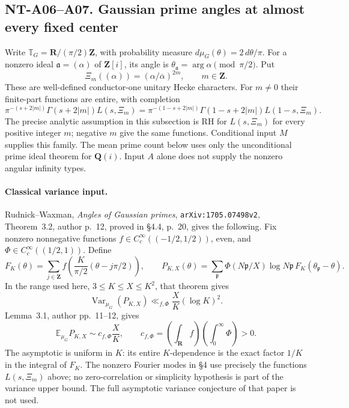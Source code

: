 \subsection*{NT-A06--A07. Gaussian prime angles at almost every fixed center}

Write \(\mathbb T_G=\mathbf R/(\pi/2)\mathbf Z\), with probability
measure \(d\mu_G(\theta)=2\,d\theta/\pi\). For a nonzero ideal
\(\mathfrak a=(\alpha)\) of \(\mathbf Z[i]\), its angle is
\(\theta_{\mathfrak a}=\arg\alpha\pmod{\pi/2}\). Put
\[
 \Xi_m((\alpha))=(\alpha/\overline\alpha)^{2m},
 \qquad m\in\mathbf Z .
\]
These are well-defined conductor-one unitary Hecke characters.
For \(m\ne0\) their finite-part functions are entire, with completion
\[
 \pi^{-(s+2|m|)}\Gamma(s+2|m|)L(s,\Xi_m)
 =
 \pi^{-(1-s+2|m|)}\Gamma(1-s+2|m|)L(1-s,\Xi_m).
\]
The precise analytic assumption in this subsection is RH for
\(L(s,\Xi_m)\) for every positive integer \(m\); negative \(m\)
give the same functions. Conditional input \(M\) supplies this family.
The mean prime count below uses only the unconditional prime ideal
theorem for \(\mathbf Q(i)\). Input \(A\) alone does not supply the
nonzero angular infinity types.

\paragraph{Classical variance input.}
Rudnick--Waxman, \emph{Angles of Gaussian primes},
\texttt{arXiv:1705.07498v2}, Theorem~3.2, author p.~12,
proved in \S4.4, p.~20, gives the following. Fix nonzero nonnegative
functions \(f\in C_c^\infty((-1/2,1/2))\), even, and
\(\Phi\in C_c^\infty((1/2,1))\). Define
\[
 F_K(\theta)=\sum_{j\in\mathbf Z}
 f\left(\frac{K}{\pi/2}(\theta-j\pi/2)\right),\qquad
 P_{K,X}(\theta)=
 \sum_{\mathfrak p}\Phi(N\mathfrak p/X)\log N\mathfrak p\,
                         F_K(\theta_{\mathfrak p}-\theta).
\]
In the range used here, \(3\le K\le X\le K^2\), that theorem gives
\[
 \operatorname{Var}_{\mu_G}(P_{K,X})
       \ll_{f,\Phi}\frac{X}{K}(\log K)^2.             \tag{A06.1}
\]
Lemma~3.1, author pp.~11--12, gives
\[
 \mathbb E_{\mu_G}P_{K,X}
       \sim c_{f,\Phi}\frac XK,\qquad
 c_{f,\Phi}=\left(\int_{\mathbf R}f\right)
            \left(\int_0^\infty\Phi\right)>0.        \tag{A06.2}
\]
The asymptotic is uniform in \(K\): its entire \(K\)-dependence is
the exact factor \(1/K\) in the integral of \(F_K\).
The nonzero Fourier modes in \S4 use precisely the functions
\(L(s,\Xi_m)\) above; no zero-correlation or simplicity hypothesis
is part of the variance upper bound. The full asymptotic variance
conjecture of that paper is not used.


